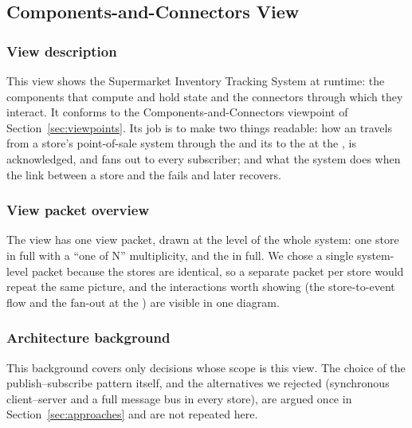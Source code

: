 \subsection{Components-and-Connectors View}
\label{sec:cc-view}

\begingroup
\renewcommand{\topfraction}{0.85}
\renewcommand{\bottomfraction}{0.7}
\renewcommand{\textfraction}{0.15}
\renewcommand{\floatpagefraction}{0.7}

\subsubsection{View description}
This view shows the Supermarket Inventory Tracking System at runtime: the components
that compute and hold state and the connectors through which they interact. It conforms
to the Components-and-Connectors viewpoint of Section~\ref{sec:viewpoints}. Its job is
to make two things readable: how an \InventoryEvent travels from a store's point-of-sale
system through the \StoreAgent and its \Outbox to the \CFE at the \DC, is acknowledged,
and fans out to every subscriber; and what the system does when the link between a store
and the \DC fails and later recovers.

\subsubsection{View packet overview}
The view has one view packet, drawn at the level of the whole system: one store in full
with a ``one of N'' multiplicity, and the \DC in full. We chose a single system-level
packet because the stores are identical, so a separate packet per store would repeat the
same picture, and the interactions worth showing (the store-to-\DC event flow and the
fan-out at the \DC) are visible in one diagram.

\subsubsection{Architecture background}
\label{sec:cc-background}
This background covers only decisions whose scope is this view. The choice of the
publish--subscribe pattern itself, and the alternatives we rejected (synchronous
client--server and a full message bus in every store), are argued once in
Section~\ref{sec:approaches} and are not repeated here.

